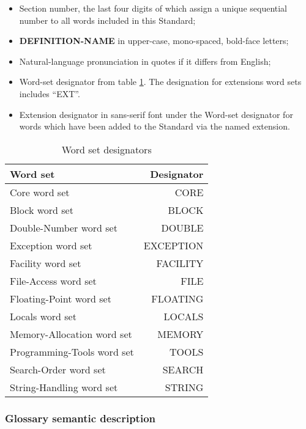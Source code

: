 \begin{itemize}
\item Section number, the last four digits of which assign a
	unique sequential number to all words included in this Standard;

\item \textbf{DEFINITION-NAME} in upper-case, mono-spaced,
	bold-face letters;

\item Natural-language pronunciation in quotes if it differs from English;

\item Word-set designator from table \ref{table:wordsets}.
	The designation for extensions word sets includes ``EXT''.

\item \textsf{Extension designator} in sans-serif font under the
	Word-set designator for words which have been added to the
	Standard via the named extension.
\end{itemize}

\begin{table}[ht]
  \begin{center}
	\caption{Word set designators}
	\label{table:wordsets}
	\begin{tabular}{lr}
	\hline\hline
	Word set & Designator \\
	\hline
	Core word set				& CORE		\\
	Block word set				& BLOCK		\\
	Double-Number word set		& DOUBLE	\\
	Exception word set			& EXCEPTION	\\
	Facility word set			& FACILITY	\\
	File-Access word set		& FILE		\\
	Floating-Point word set		& FLOATING	\\
	Locals word set				& LOCALS	\\
	Memory-Allocation word set	& MEMORY	\\
	Programming-Tools word set	& TOOLS		\\
	Search-Order word set		& SEARCH	\\
	String-Handling word set	& STRING	\\
	\hline\hline
	\end{tabular}
  \end{center}
\end{table}

\subsubsection{Glossary semantic description}

